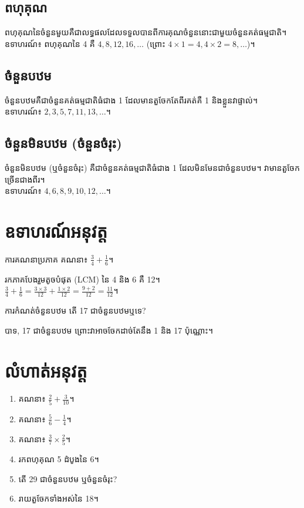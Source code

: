 \subsection{ពហុគុណ}
ពហុគុណនៃចំនួនមួយគឺជាលទ្ធផលដែលទទួលបានពីការគុណចំនួននោះជាមួយចំនួនគត់ធម្មជាតិ។\\
ឧទាហរណ៍៖ ពហុគុណនៃ 4 គឺ $4, 8, 12, 16, \dots$ (ព្រោះ $4\times1=4, 4\times2=8, \dots$)។

\subsection{ចំនួនបឋម}
ចំនួនបឋមគឺជាចំនួនគត់ធម្មជាតិធំជាង 1 ដែលមានតួចែកតែពីរគត់គឺ 1 និងខ្លួនវាផ្ទាល់។\\
ឧទាហរណ៍៖ $2, 3, 5, 7, 11, 13, \dots$។

\subsection{ចំនួនមិនបឋម (ចំនួនចំរុះ)}
ចំនួនមិនបឋម (ឬចំនួនចំរុះ) គឺជាចំនួនគត់ធម្មជាតិធំជាង 1 ដែលមិនមែនជាចំនួនបឋម។ វាមានតួចែកច្រើនជាងពីរ។\\
ឧទាហរណ៍៖ $4, 6, 8, 9, 10, 12, \dots$។

\section{ឧទាហរណ៍អនុវត្ត}

\begin{example}{ការគណនាប្រភាគ}
    គណនា៖ $\frac{3}{4} + \frac{1}{6}$។
    \begin{solution}
        រកភាគបែងរួមតូចបំផុត (LCM) នៃ 4 និង 6 គឺ 12។\\
        $\frac{3}{4} + \frac{1}{6} = \frac{3 \times 3}{12} + \frac{1 \times 2}{12} = \frac{9+2}{12} = \frac{11}{12}$។
    \end{solution}
\end{example}

\begin{example}{ការកំណត់ចំនួនបឋម}
    តើ 17 ជាចំនួនបឋមឬទេ?
    \begin{solution}
        បាទ, 17 ជាចំនួនបឋម ព្រោះវាអាចចែកដាច់តែនឹង 1 និង 17 ប៉ុណ្ណោះ។
    \end{solution}
\end{example}

\section{លំហាត់អនុវត្ត}
\begin{enumerate}[label=\arabic*.]
    \item គណនា៖ $\frac{2}{5} + \frac{3}{10}$។
    \item គណនា៖ $\frac{5}{6} - \frac{1}{4}$។
    \item គណនា៖ $\frac{3}{7} \times \frac{2}{5}$។
    \item រកពហុគុណ 5 ដំបូងនៃ 6។
    \item តើ 29 ជាចំនួនបឋម ឬចំនួនចំរុះ?
    \item រាយតួចែកទាំងអស់នៃ 18។
\end{enumerate}

